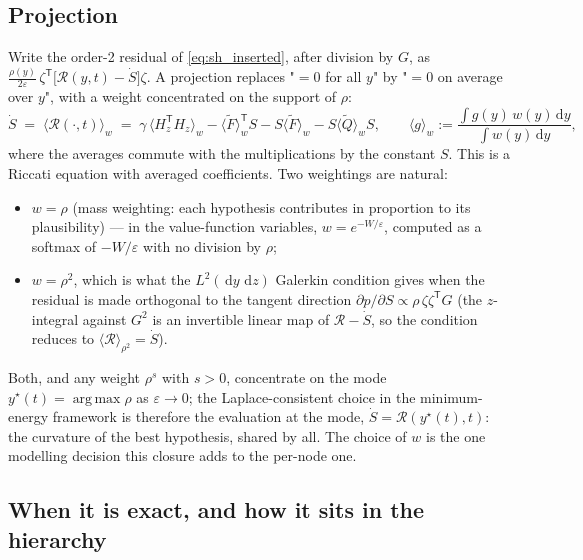 \documentclass[11pt,a4paper]{article}
\newcommand{\dd}{\,\mathrm{d}}
\newcommand{\argmax}{\operatorname{arg\,max}}
\newcommand{\T}{^{\mathsf T}}
\newcommand{\eps}{\varepsilon}
\theoremstyle{plain}
\theoremstyle{definition}
\theoremstyle{remark}
\begin{document}
\subsection{Projection}

Write the order-2 residual of \eqref{eq:sh_inserted}, after division by $G$, as $\tfrac{\rho(y)}{2\eps}\,\zeta\T\big[\mathcal R(y,t)-\dot S\big]\zeta$. A projection replaces "$=0$ for all $y$" by "$=0$ on average over $y$", with a weight concentrated on the support of $\rho$:
\begin{equation}
  \dot S \;=\; \big\langle\mathcal R(\cdot,t)\big\rangle_w
  \;=\; \gamma\,\langle H_z\T H_z\rangle_w - \langle\tilde F\rangle_w\T S - S\langle\tilde F\rangle_w - S\langle\tilde Q\rangle_w S,
  \qquad \langle g\rangle_w := \frac{\int g(y)\,w(y)\dd y}{\int w(y)\dd y},
  \label{eq:sh_S}
\end{equation}
where the averages commute with the multiplications by the constant $S$. This is a Riccati equation with averaged coefficients. Two weightings are natural:
\begin{itemize}[nosep]
  \item $w=\rho$ (mass weighting: each hypothesis contributes in proportion to its plausibility) --- in the value-function variables, $w = e^{-W/\eps}$, computed as a softmax of $-W/\eps$ with no division by $\rho$;
  \item $w=\rho^2$, which is what the $L^2(\dd y\,\dd z)$ Galerkin condition gives when the residual is made orthogonal to the tangent direction $\partial p/\partial S\propto\rho\,\zeta\zeta\T G$ (the $z$-integral against $G^2$ is an invertible linear map of $\mathcal R-\dot S$, so the condition reduces to $\langle\mathcal R\rangle_{\rho^2}=\dot S$).
\end{itemize}
Both, and any weight $\rho^s$ with $s>0$, concentrate on the mode $y^\star(t)=\argmax\rho$ as $\eps\to0$; the Laplace-consistent choice in the minimum-energy framework is therefore the evaluation at the mode, $\dot S = \mathcal R(y^\star(t),t)$: the curvature of the best hypothesis, shared by all. The choice of $w$ is the one modelling decision this closure adds to the per-node one.

\subsection{When it is exact, and how it sits in the hierarchy}
\end{document}
